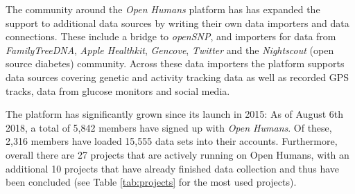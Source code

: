 \documentclass[a4paper,num-refs]{oup-contemporary}
\begin{document}
The community around the \textit{Open Humans} platform has has expanded the support to additional data sources by writing their own data importers and data connections. These include a bridge to \textit{openSNP}, and importers for data from \textit{FamilyTreeDNA}, \textit{Apple Healthkit}, \textit{Gencove}, \textit{Twitter} and the \textit{Nightscout} (open source diabetes) community. Across these data importers the platform supports data sources covering genetic and activity tracking data as well as recorded GPS tracks, data from glucose monitors and social media.

The platform has significantly grown since its launch in 2015: As of August 6th 2018, a total of 5,842 members have signed up with \textit{Open Humans}. Of these, 2,316 members have loaded 15,555 data sets into their accounts. Furthermore, overall there are 27 projects that are actively running on Open Humans, with an additional 10 projects that have already finished data collection and thus have been concluded (see Table \ref{tab:projects} for the most used projects).
\end{document}
